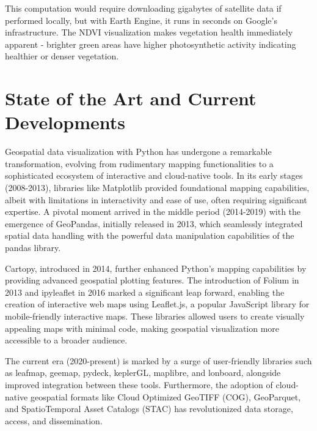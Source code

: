 This computation would require downloading gigabytes of satellite data if performed locally, but with Earth Engine, it runs in seconds on Google's infrastructure. The NDVI visualization makes vegetation health immediately apparent - brighter green areas have higher photosynthetic activity indicating healthier or denser vegetation.

\section{State of the Art and Current Developments}\label{sec:SOTA}

Geospatial data visualization with Python has undergone a remarkable transformation, evolving from rudimentary mapping functionalities to a sophisticated ecosystem of interactive and cloud-native tools. In its early stages (2008-2013), libraries like Matplotlib provided foundational mapping capabilities, albeit with limitations in interactivity and ease of use, often requiring significant expertise. A pivotal moment arrived in the middle period (2014-2019) with the emergence of GeoPandas, initially released in 2013, which seamlessly integrated spatial data handling with the powerful data manipulation capabilities of the pandas library.

Cartopy, introduced in 2014, further enhanced Python's mapping capabilities by providing advanced geospatial plotting features. The introduction of Folium in 2013 and ipyleaflet in 2016 marked a significant leap forward, enabling the creation of interactive web maps using Leaflet.js, a popular JavaScript library for mobile-friendly interactive maps. These libraries allowed users to create visually appealing maps with minimal code, making geospatial visualization more accessible to a broader audience.

The current era (2020-present) is marked by a surge of user-friendly libraries such as leafmap, geemap, pydeck, keplerGL, maplibre, and lonboard, alongside improved integration between these tools. Furthermore, the adoption of cloud-native geospatial formats like Cloud Optimized GeoTIFF (COG), GeoParquet, and SpatioTemporal Asset Catalogs (STAC) has revolutionized data storage, access, and dissemination.

